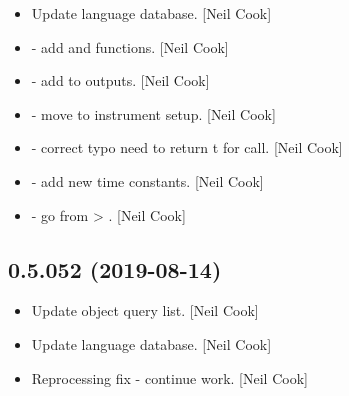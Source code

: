 \documentclass[a4paper,10pt,english]{report}
\begin{document}
\begin{itemize}
\item {} 
Update language database. {[}Neil Cook{]}

\item {} 
 - add  and  functions.
{[}Neil Cook{]}

\item {} 
 - add  to
outputs. {[}Neil Cook{]}

\item {} 
 - move  to instrument
setup. {[}Neil Cook{]}

\item {} 
 - correct typo need to return t for 
call. {[}Neil Cook{]}

\item {} 
 - add new time constants. {[}Neil Cook{]}

\item {} 
 - go from  \textendash{}\textgreater{} . {[}Neil Cook{]}

\end{itemize}


\subsection{0.5.052 (2019-08-14)}
\label{\detokenize{misc/changelog:id90}}\begin{itemize}
\item {} 
Update object query list. {[}Neil Cook{]}

\item {} 
Update language database. {[}Neil Cook{]}

\item {} 
Reprocessing fix - continue work. {[}Neil Cook{]}

\end{itemize}
\end{document}
